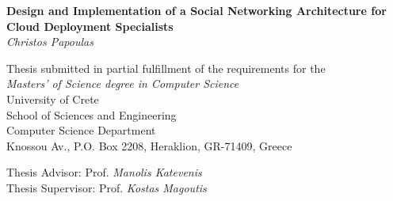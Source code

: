 \begin{titlepage}
\begin{center}

\LARGE \textbf{Design and Implementation of a Social Networking Architecture for Cloud Deployment Specialists}\\[0.5cm]
\LARGE \textit{Christos Papoulas}\\[0.5cm]

\vfill

\normalsize{
Thesis submitted in partial fulfillment of the requirements for the\\[0.30cm]

\textit{Masters' of Science degree in Computer Science}}\\[0.30cm]

University of Crete\\
School of Sciences and Engineering\\
Computer Science Department\\
Knossou Av., P.O. Box 2208, Heraklion, GR-71409, Greece\\[0.5cm]

\vfill

\Large{Thesis Advisor: Prof. \emph{Manolis Katevenis}}\\[0.5cm]
\Large{Thesis Supervisor: Prof. \emph{Kostas Magoutis}}\\[0.5cm]
\vfill

\end{center}

\end{titlepage}
